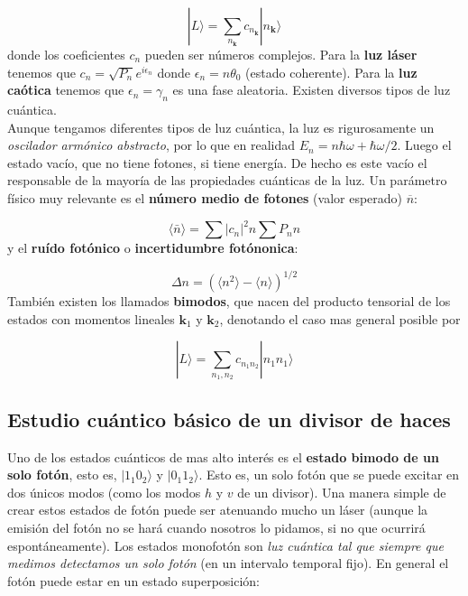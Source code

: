 \documentclass[12pt,a4paper]{book}
\numberwithin{equation}{section}
\numberwithin{figure}{section}
\newcommand{\parentesis}[1]{\left( #1  \right)}
\newcommand{\1}{_{(1)}}
\newcommand{\2}{_{(2)}}
\newcommand{\kn}{\mathbf{k}}
\theoremstyle{definition}
\begin{document}
\begin{equation}
|L\rangle = \sum_{n_\kn} c_{n_\kn } |n_{\kn} \rangle
\end{equation}
donde los coeficientes $c_n$ pueden ser números complejos. Para la \textbf{luz láser} tenemos que $c_n=\sqrt{P_n} e^{i \epsilon_n}$ donde $\epsilon_n  =n\theta_0$ (estado coherente). Para la \textbf{luz caótica} tenemos que $\epsilon_n = \gamma_n$ es una fase aleatoria. Existen diversos tipos de luz cuántica. \\

Aunque tengamos diferentes tipos de luz cuántica, la luz es rigurosamente un \textit{oscilador armónico abstracto}, por lo que en realidad $E_n = n \hbar \omega +  \hbar \omega/2$. Luego el estado vacío, que no tiene fotones, si tiene energía. De hecho es este vacío el responsable de la mayoría de las propiedades cuánticas de la luz. Un parámetro físico muy relevante es el \textbf{número medio de fotones} (valor esperado) $\overline{n}$:

\begin{equation}
\langle \bar{n} \rangle = \sum |c_n|^2 n  \sum P_n n 
\end{equation}
y el \textbf{ruído fotónico} o \textbf{incertidumbre fotónonica}:

\begin{equation}
\Delta n = \parentesis{\langle n^2 \rangle - \langle n \rangle }^{1/2}
\end{equation}
También existen los llamados \textbf{bimodos}, que nacen del producto tensorial de los estados con momentos lineales $\kn_1$ y $\kn_2$, denotando el caso mas general posible por

\begin{equation}
|L\rangle = \sum_{n_1,n_2} c_{n_1n_2} |n_1 n_1 \rangle
\end{equation}

\subsection{Estudio cuántico básico de un divisor de haces}

Uno de los estados cuánticos de mas alto interés es el \textbf{estado bimodo de un solo fotón}, esto es, $|1_1 0_2\rangle$ y $|0_1 1_2\rangle$. Esto es, un solo fotón que se puede excitar en dos únicos modos (como los modos $h$ y $v$ de un divisor). Una manera simple de crear estos estados de fotón puede ser atenuando mucho un láser (aunque la emisión del fotón no se hará cuando nosotros lo pidamos, si no que ocurrirá espontáneamente). Los estados monofotón son \textit{luz cuántica tal que siempre que medimos detectamos un solo fotón} (en un intervalo temporal fijo). En general el fotón puede estar en un estado superposición:
\end{document}
